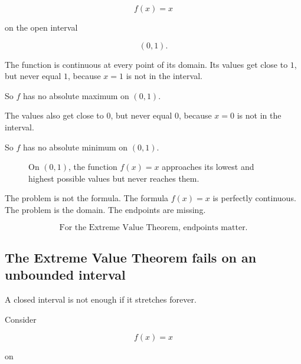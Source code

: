\[
f(x)=x
\]

on the open interval

\[
(0,1).
\]

The function is continuous at every point of its domain.  Its values get close to \(1\), but never equal \(1\), because \(x=1\) is not in the interval.

So \(f\) has no absolute maximum on \((0,1)\).

The values also get close to \(0\), but never equal \(0\), because \(x=0\) is not in the interval.

So \(f\) has no absolute minimum on \((0,1)\).

\begin{figure}[h]
\centering
{}
\caption{On \((0,1)\), the function \(f(x)=x\) approaches its lowest and highest possible values but never reaches them.}
\label{fig:evt-warning-open-interval}
\end{figure}

The problem is not the formula.  The formula \(f(x)=x\) is perfectly continuous.  The problem is the domain.  The endpoints are missing.

\[
\boxed{\text{For the Extreme Value Theorem, endpoints matter.}}
\]

\subsection{The Extreme Value Theorem fails on an unbounded interval}
\label{subsec:evt-fails-unbounded-interval-warning}

A closed interval is not enough if it stretches forever.

Consider

\[
f(x)=x
\]

on

